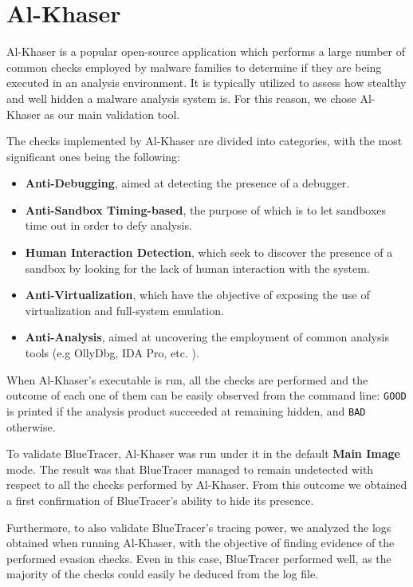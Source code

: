 \vspace{-2cm}
\section{Al-Khaser}
Al-Khaser \cite{AlK} is a popular open-source application which performs a large number of common checks employed by malware families to determine if they are being executed in an analysis environment. It is typically utilized to assess how stealthy and well hidden a malware analysis system is. For this reason, we chose Al-Khaser as our main validation tool.

The checks implemented by Al-Khaser are divided into categories, with the most significant ones being the following:
\begin{itemize}
\item \textbf{Anti-Debugging}, aimed at detecting the presence of a debugger.
\item \textbf{Anti-Sandbox Timing-based}, the purpose of which is to let sandboxes time out in order to defy analysis. 
\item \textbf{Human Interaction Detection}, which seek to discover the presence of a sandbox by looking for the lack of human interaction with the system.
\item \textbf{Anti-Virtualization}, which have the objective of exposing the use of virtualization and full-system emulation. 
\item \textbf{Anti-Analysis}, aimed at uncovering the employment of common analysis tools (e.g OllyDbg, IDA Pro, etc. ).
\end{itemize}  

When Al-Khaser's executable is run, all the checks are performed and the outcome of each one of them can be easily observed from the command line: \texttt{GOOD} is printed if the analysis product succeeded at remaining hidden, and \texttt{BAD} otherwise. 

To validate BlueTracer, Al-Khaser was run under it in the default \textbf{Main Image} mode. The result was that BlueTracer managed to remain undetected with respect to all the checks performed by Al-Khaser. From this outcome we obtained a first confirmation of BlueTracer's ability to hide its presence. 

Furthermore, to also validate BlueTracer's tracing power, we analyzed the logs obtained when running Al-Khaser, with the objective of finding evidence of the performed evasion checks.
Even in this case, BlueTracer performed well, as the majority of the checks could easily be deduced from the log file. 

